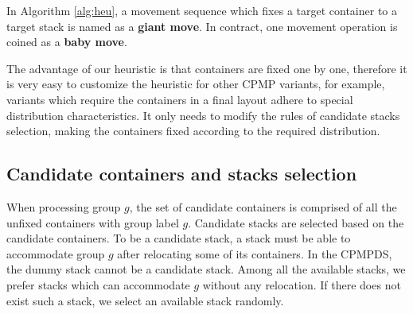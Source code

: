 \documentclass[review,3p,times,authoryear,12pt]{elsarticle}
\begin{document}
In Algorithm \ref{alg:heu}, a movement sequence which fixes a target container to a target stack is named as a \textbf{giant move}. In contract, one movement operation is coined as a \textbf{baby move}.

The advantage of our heuristic is that containers are fixed one by one, therefore it is very easy to customize the heuristic for other CPMP variants, for example, variants which require the containers in a final layout adhere to special distribution characteristics. It only needs to modify the rules of candidate stacks selection, making the containers fixed according to the required distribution.



\subsection{Candidate containers and stacks selection}
\label{sec:can}
When processing group $g$, the set of candidate containers is comprised of all the unfixed containers with group label $g$. Candidate stacks are selected based on the candidate containers.
To be a candidate stack, a stack must be able to accommodate group $g$ after relocating some of its containers.
In the CPMPDS, the dummy stack cannot be a candidate stack. Among all the available stacks, we prefer stacks which can accommodate $g$ without any relocation. If there does not exist such a stack, we select an available stack randomly.
\end{document}
